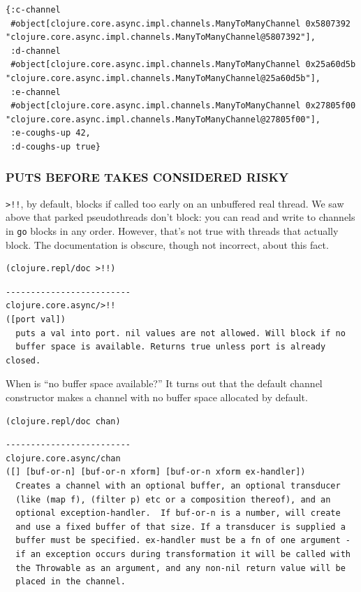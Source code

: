 \documentclass[10pt,oneside,x11names]{article}
\begin{document}
\begin{verbatim}
{:c-channel
 #object[clojure.core.async.impl.channels.ManyToManyChannel 0x5807392 "clojure.core.async.impl.channels.ManyToManyChannel@5807392"],
 :d-channel
 #object[clojure.core.async.impl.channels.ManyToManyChannel 0x25a60d5b "clojure.core.async.impl.channels.ManyToManyChannel@25a60d5b"],
 :e-channel
 #object[clojure.core.async.impl.channels.ManyToManyChannel 0x27805f00 "clojure.core.async.impl.channels.ManyToManyChannel@27805f00"],
 :e-coughs-up 42,
 :d-coughs-up true}
\end{verbatim}

\subsubsection{PUTS BEFORE TAKES CONSIDERED RISKY}
\label{puts-before-takes-considered-risky}
\texttt{>!!}, by default, blocks if called too early on an unbuffered real
thread. We saw above that parked pseudothreads don't block: you can read
and write to channels in \texttt{go} blocks in any order. However, that's not
true with threads that actually block. The documentation is obscure,
though not incorrect, about this fact.

\begin{verbatim}
(clojure.repl/doc >!!)
\end{verbatim}

\begin{verbatim}
-------------------------
clojure.core.async/>!!
([port val])
  puts a val into port. nil values are not allowed. Will block if no
  buffer space is available. Returns true unless port is already closed.
\end{verbatim}


When is ``no buffer space available?'' It turns out that the default
channel constructor makes a channel with no buffer space allocated by
default.

\begin{verbatim}
(clojure.repl/doc chan)
\end{verbatim}

\begin{verbatim}
-------------------------
clojure.core.async/chan
([] [buf-or-n] [buf-or-n xform] [buf-or-n xform ex-handler])
  Creates a channel with an optional buffer, an optional transducer
  (like (map f), (filter p) etc or a composition thereof), and an
  optional exception-handler.  If buf-or-n is a number, will create
  and use a fixed buffer of that size. If a transducer is supplied a
  buffer must be specified. ex-handler must be a fn of one argument -
  if an exception occurs during transformation it will be called with
  the Throwable as an argument, and any non-nil return value will be
  placed in the channel.
\end{verbatim}
\end{document}
